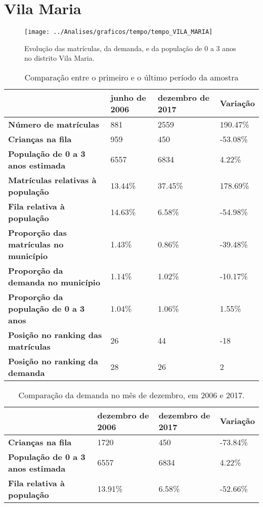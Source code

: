 \section{Vila Maria}
\begin{figure}[H]
\centering
\texttt{[image: ../Analises/graficos/tempo/tempo\_VILA\_MARIA]}
\caption{Evolução das matrículas, da demanda, e da população de 0 a 3 anos no distrito Vila Maria.}
\end{figure}
\begin{table}[H]
\begin{tabular}{|l|l|l|l|}
\hline
\textbf{}                                      & \textbf{junho de 2006}       & \textbf{dezembro de 2017}    & \textbf{Variação} \\ \hline
\textbf{Número de matrículas}                  & 881 & 2559 & 190.47\% \\ \hline
\textbf{Crianças na fila}                      & 959 & 450 & -53.08\% \\ \hline
\textbf{População de 0 a 3 anos estimada}      & 6557 & 6834 & 4.22\% \\ \hline
\textbf{Matrículas relativas à população}      & 13.44\% & 37.45\% & 178.69\% \\ \hline
\textbf{Fila relativa à população}             & 14.63\% & 6.58\% & -54.98\% \\ \hline
\textbf{Proporção das matrículas no município} & 1.43\% & 0.86\% & -39.48\% \\ \hline
\textbf{Proporção da demanda no município}     & 1.14\% & 1.02\% & -10.17\% \\ \hline
\textbf{Proporção da população de 0 a 3 anos}  & 1.04\% & 1.06\% & 1.55\% \\ \hline
\textbf{Posição no ranking das matrículas}     & 26 & 44 & -18 \\ \hline
\textbf{Posição no ranking da demanda}         & 28 & 26 & 2 \\ \hline
\end{tabular}
\caption{Comparação entre o primeiro e o último período da amostra}
\end{table}
\begin{table}[H]
\begin{tabular}{|l|l|l|l|}
\hline
\textbf{}                                 & \textbf{dezembro de 2006} & \textbf{dezembro de 2017} & \textbf{Variação} \\ \hline
\textbf{Crianças na fila}                      & 1720 & 450 & -73.84\% \\ \hline
\textbf{População de 0 a 3 anos estimada}      & 6557 & 6834 & 4.22\% \\ \hline
\textbf{Fila relativa à população}             & 13.91\% & 6.58\% & -52.66\% \\ \hline
\end{tabular}
\caption{Comparação da demanda no mês de dezembro, em 2006 e 2017.}
\end{table}
